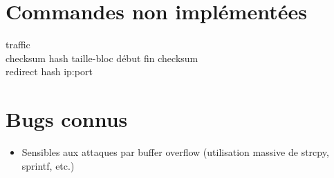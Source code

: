 \section{Commandes non implémentées}
\begin{description}
    \item[traffic]
    \item[checksum hash taille-bloc début fin checksum] 
    \item[redirect hash ip:port]

\end{description}
\section{Bugs connus}
\begin{itemize}
    \item Sensibles aux attaques par buffer overflow (utilisation massive de
strcpy, sprintf, etc.)
\end{itemize}
